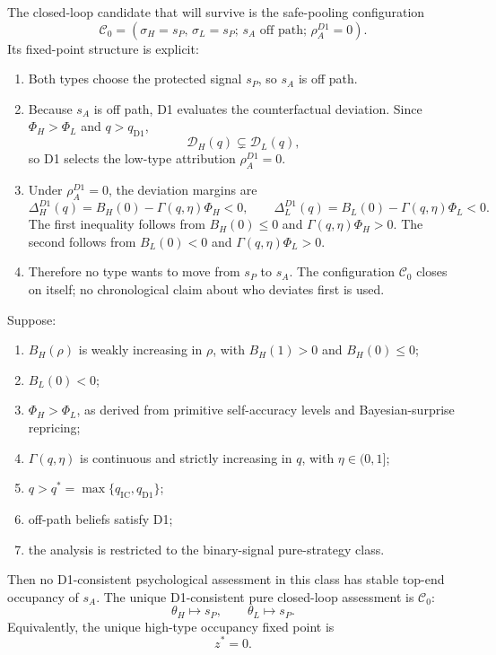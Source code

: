 The closed-loop candidate that will survive is the safe-pooling configuration
\[
\mathcal C_0
=
\left(
\sigma_H=s_P,\,
\sigma_L=s_P;\,
s_A\text{ off path};\,
\rho_A^{D1}=0
\right).
\]
Its fixed-point structure is explicit:
\begin{enumerate}
\item Both types choose the protected signal \(s_P\), so \(s_A\) is off path.
\item Because \(s_A\) is off path, D1 evaluates the counterfactual deviation. Since \(\Phi_H>\Phi_L\) and \(q>q_{\mathrm{D1}}\),
\[
\mathcal D_H(q)\subsetneq \mathcal D_L(q),
\]
so D1 selects the low-type attribution \(\rho_A^{D1}=0\).
\item Under \(\rho_A^{D1}=0\), the deviation margins are
\[
\Delta_H^{D1}(q)=B_H(0)-\Gamma(q,\eta)\Phi_H<0,
\qquad
\Delta_L^{D1}(q)=B_L(0)-\Gamma(q,\eta)\Phi_L<0.
\]
The first inequality follows from \(B_H(0)\le 0\) and \(\Gamma(q,\eta)\Phi_H>0\). The second follows from \(B_L(0)<0\) and \(\Gamma(q,\eta)\Phi_L>0\).
\item Therefore no type wants to move from \(s_P\) to \(s_A\). The configuration \(\mathcal C_0\) closes on itself; no chronological claim about who deviates first is used.
\end{enumerate}

\begin{theorem}
\label{thm:belief-loop-fixed-point}
Suppose:
\begin{enumerate}
\item \(B_H(\rho)\) is weakly increasing in \(\rho\), with \(B_H(1)>0\) and \(B_H(0)\le 0\);
\item \(B_L(0)<0\);
\item \(\Phi_H>\Phi_L\), as derived from primitive self-accuracy levels and Bayesian-surprise repricing;
\item \(\Gamma(q,\eta)\) is continuous and strictly increasing in \(q\), with \(\eta \in (0,1]\);
\item \(q>q^*=\max\{q_{\mathrm{IC}},q_{\mathrm{D1}}\}\);
\item off-path beliefs satisfy D1;
\item the analysis is restricted to the binary-signal pure-strategy class.
\end{enumerate}
Then no D1-consistent psychological assessment in this class has stable top-end occupancy of \(s_A\). The unique D1-consistent pure closed-loop assessment is \(\mathcal C_0\):
\[
\theta_H\mapsto s_P,
\qquad
\theta_L\mapsto s_P.
\]
Equivalently, the unique high-type occupancy fixed point is
\[
z^*=0.
\]
\end{theorem}

